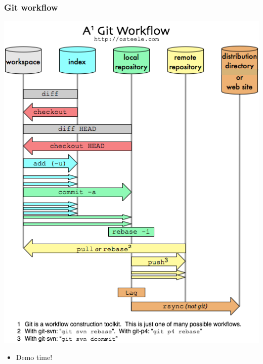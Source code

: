 \documentclass{beamer}
\begin{document}
\begin{frame}
    \frametitle{Git workflow}
    \includegraphics[scale = 0.3]{images/git-workflow.png}
\end{frame}

\begin{frame}
    \begin{itemize}
	\item Demo time!
    \end{itemize}
\end{frame}
\end{document}
